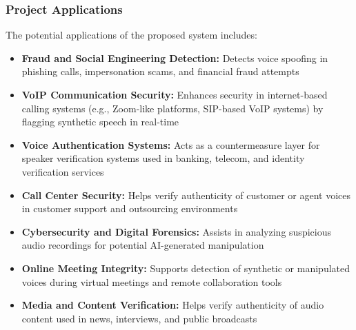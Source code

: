 \subsubsection{Project Applications}

The potential applications of the proposed system includes:
\begin{itemize}
    \item \textbf{Fraud and Social Engineering Detection:} Detects voice spoofing in phishing calls, impersonation scams, and financial fraud attempts
    \item \textbf{VoIP Communication Security:} Enhances security in internet-based calling systems (e.g., Zoom-like platforms, SIP-based VoIP systems) by flagging synthetic speech in real-time
    \item \textbf{Voice Authentication Systems:} Acts as a countermeasure layer for speaker verification systems used in banking, telecom, and identity verification services
    \item \textbf{Call Center Security:} Helps verify authenticity of customer or agent voices in customer support and outsourcing environments
    \item \textbf{Cybersecurity and Digital Forensics:} Assists in analyzing suspicious audio recordings for potential AI-generated manipulation
    \item \textbf{Online Meeting Integrity:} Supports detection of synthetic or manipulated voices during virtual meetings and remote collaboration tools
    \item \textbf{Media and Content Verification:} Helps verify authenticity of audio content used in news, interviews, and public broadcasts
\end{itemize}

